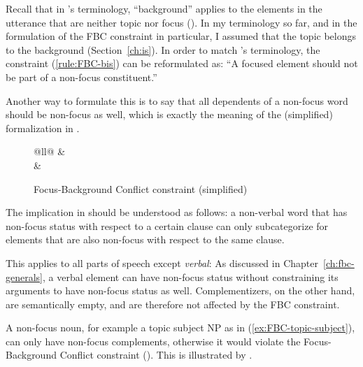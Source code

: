 Recall that in \citeauthor{Song.2017}'s terminology, ``background'' applies to the elements in the utterance that are neither topic nor focus (). In my terminology so far, and in the formulation of the FBC constraint in particular, I assumed that the topic belongs to the background (Section~\ref{ch:is}). In order to match \citeauthor{Song.2017}'s terminology, the constraint (\ref{rule:FBC-bis}) can be reformulated as: ``A focused element should not be part of a non-focus constituent.'' 

Another way to formulate this is to say that all dependents of a non-focus word should be non-focus as well, which is exactly the meaning of the  (simplified) formalization in . 

\begin{figure}
\caption{Focus-Background Conflict constraint (simplified)}
\label{avm:rule-FBC}
    \begin{tabular}{@{}ll@{}}
	&  \\\addlinespace
	\impl & 
    \end{tabular}
\end{figure}

The implication in  should be understood as follows: a non-verbal word that has non-focus status with respect to a certain clause can only subcategorize for elements that are also non-focus with respect to the same clause. 



This applies to all parts of speech except \emph{verbal}: As discussed in Chapter~\ref{ch:fbc-generals}, a verbal element can have non-focus status without constraining its arguments to have non-focus status as well. Complementizers, on the other hand, are semantically empty, and are therefore not affected by the FBC constraint. 

A non-focus noun, for example a topic subject NP as in (\ref{ex:FBC-topic-subject}), can only have non-focus complements, otherwise it would violate the Focus-Background Conflict constraint (). This is illustrated by .

